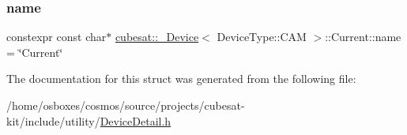 \subsubsection{\texorpdfstring{name}{name}}
{\footnotesize\ttfamily constexpr const char$\ast$ \hyperlink{structcubesat_1_1__Device}{cubesat\+::\+\_\+\+Device}$<$ Device\+Type\+::\+C\+AM $>$\+::Current\+::name = \char`\"{}Current\char`\"{}\hspace{0.3cm}{\ttfamily [static]}}



The documentation for this struct was generated from the following file\+:\begin{DoxyCompactItemize}
\item 
/home/osboxes/cosmos/source/projects/cubesat-\/kit/include/utility/\hyperlink{DeviceDetail_8h}{Device\+Detail.\+h}\end{DoxyCompactItemize}
